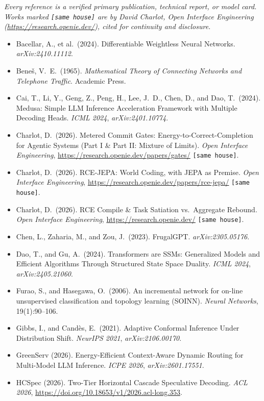 \documentclass[10pt]{article}
\begin{document}
{\small
\emph{Every reference is a verified primary publication, technical report, or model card. Works marked \texttt{[same house]} are by David Charlot, Open Interface Engineering (\url{https://research.openie.dev/}), cited for continuity and disclosure.}

\begin{itemize}
  \item Bacellar, A., et al.\ (2024). Differentiable Weightless Neural Networks. \emph{arXiv:2410.11112}.
  \item Bene\v{s}, V.\ E.\ (1965). \emph{Mathematical Theory of Connecting Networks and Telephone Traffic}. Academic Press.
  \item Cai, T., Li, Y., Geng, Z., Peng, H., Lee, J.\ D., Chen, D., and Dao, T.\ (2024). Medusa: Simple LLM Inference Acceleration Framework with Multiple Decoding Heads. \emph{ICML 2024}, \emph{arXiv:2401.10774}.
  \item Charlot, D.\ (2026). Metered Commit Gates: Energy-to-Correct-Completion for Agentic Systems (Part I \& Part II: Mixture of Limits). \emph{Open Interface Engineering}, \url{https://research.openie.dev/papers/gates/} \texttt{[same house]}.
  \item Charlot, D.\ (2026). RCE-JEPA: World Coding, with JEPA as Premise. \emph{Open Interface Engineering}, \url{https://research.openie.dev/papers/rce-jepa/} \texttt{[same house]}.
  \item Charlot, D.\ (2026). RCE Compile \& Task Satiation vs.\ Aggregate Rebound. \emph{Open Interface Engineering}, \url{https://research.openie.dev/} \texttt{[same house]}.
  \item Chen, L., Zaharia, M., and Zou, J.\ (2023). FrugalGPT. \emph{arXiv:2305.05176}.
  \item Dao, T., and Gu, A.\ (2024). Transformers are SSMs: Generalized Models and Efficient Algorithms Through Structured State Space Duality. \emph{ICML 2024}, \emph{arXiv:2405.21060}.
  \item Furao, S., and Hasegawa, O.\ (2006). An incremental network for on-line unsupervised classification and topology learning (SOINN). \emph{Neural Networks}, 19(1):90--106.
  \item Gibbs, I., and Cand\`es, E.\ (2021). Adaptive Conformal Inference Under Distribution Shift. \emph{NeurIPS 2021}, \emph{arXiv:2106.00170}.
  \item GreenServ (2026). Energy-Efficient Context-Aware Dynamic Routing for Multi-Model LLM Inference. \emph{ICPE 2026}, \emph{arXiv:2601.17551}.
  \item HCSpec (2026). Two-Tier Horizontal Cascade Speculative Decoding. \emph{ACL 2026}, \url{https://doi.org/10.18653/v1/2026.acl-long.353}.

\end{itemize}}
\end{document}
